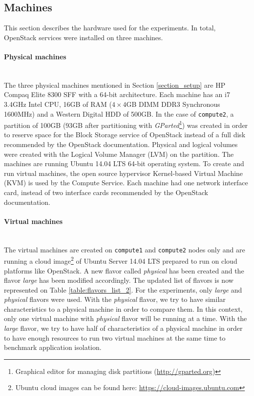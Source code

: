 \subsection{Machines}
This section describes the hardware used for the experiments.
In total, OpenStack services were installed on three machines.


\paragraph{Physical machines}\mbox{}\\
The three physical machines mentioned in Section \ref{section_setup} are HP Compaq Elite 8300 SFF with a 64-bit architecture. 
Each machine has an i7 3.4GHz Intel CPU, 16GB of RAM ($4\times4$GB DIMM DDR3 Synchronous 1600MHz) and a Western Digital HDD of 500GB. 
In the case of \texttt{compute2}, a partition of 100GB (93GB after partitioning with \textit{GParted}\footnote{Graphical editor for managing disk partitions (\url{http://gparted.org})}) was created in order to reserve space for the Block Storage service of OpenStack instead of a full disk recommended by the OpenStack documentation. 
Physical and logical volumes were created with the Logical Volume Manager (LVM) on the partition.
The machines are running Ubuntu 14.04 LTS 64-bit operating system. 
To create and run virtual machines, the open source hypervisor Kernel-based Virtual Machine (KVM) is used by the Compute Service. Each machine had one network interface card, instead of two interface cards recommended by the OpenStack documentation.


\paragraph{Virtual machines}\mbox{}\\
The virtual machines are created on \texttt{compute1} and \texttt{compute2} nodes only and are running a cloud image\footnote{Ubuntu cloud images can be found here: \url{https://cloud-images.ubuntu.com}} of Ubuntu Server 14.04 LTS prepared to run on cloud platforms like OpenStack. 
A new flavor called \textit{physical} has been created and the flavor \textit{large} has been modified accordingly.
The updated list of flavors is now represented on Table \ref{table:flavors_list_2}. 
For the experiments, only \textit{large} and \textit{physical} flavors were used. 
With the \textit{physical} flavor, we try to have similar characteristics to a physical machine in order to compare them. 
In this context, only one virtual machine with \textit{physical} flavor will be running at a time. 
With the \textit{large} flavor, we try to have half of characteristics of a physical machine in order to have enough resources to run two virtual machines at the same time to benchmark application isolation.


